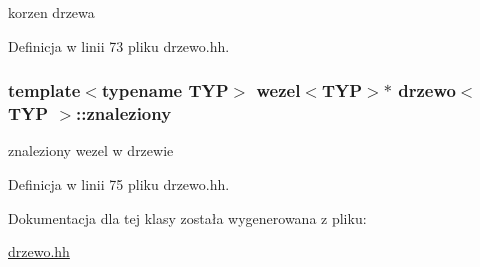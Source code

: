 korzen drzewa 



\-Definicja w linii 73 pliku drzewo.\-hh.

\hypertarget{classdrzewo_a5c5ca950d7ee79f135c50bd33dba3745}{
\subsubsection[{znaleziony}]{\setlength{\rightskip}{0pt plus 5cm}template$<$typename \-T\-Y\-P$>$ {\bf wezel}$<$\-T\-Y\-P$>$$\ast$ {\bf drzewo}$<$ \-T\-Y\-P $>$\-::{\bf znaleziony}}}\label{classdrzewo_a5c5ca950d7ee79f135c50bd33dba3745}


znaleziony wezel w drzewie 



\-Definicja w linii 75 pliku drzewo.\-hh.



\-Dokumentacja dla tej klasy została wygenerowana z pliku\-:\begin{DoxyCompactItemize}
\item 
\hyperlink{drzewo_8hh}{drzewo.\-hh}\end{DoxyCompactItemize}

